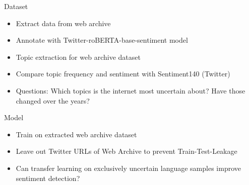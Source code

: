 \documentclass{beamer}
\begin{document}
\begin{frame}{Dataset}
	\begin{itemize}
			\setlength\itemsep{5pt}
			\item Extract data from web archive
			\item Annotate with Twitter-roBERTA-base-sentiment model\footnotemark
			\item Topic extraction for web archive dataset
			\item Compare topic frequency and sentiment with Sentiment140 (Twitter)
			\item Questions: Which topics is the internet most uncertain about? Have those changed over the years?
	\end{itemize}
\end{frame}

\begin{frame}{Model}
	\begin{itemize}
			\setlength\itemsep{5pt}
			\item Train on extracted web archive dataset
			\item Leave out Twitter URLs of Web Archive to prevent Train-Test-Leakage
			\item Can transfer learning on exclusively uncertain language samples improve sentiment detection?
	\end{itemize}
\end{frame}
\end{document}
